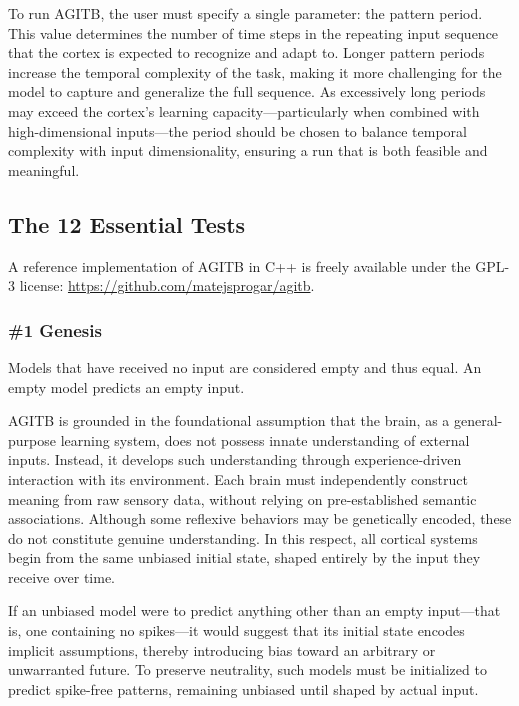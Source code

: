 \documentclass{article}
\newenvironment{two_assertions}[2]
{
  \begin{tabular}{p{1.5cm}p{8.2cm}}
    \textbf{Assertion:} & #1 \\
    \textbf{Assertion:} & #2 \\
}{
  \end{tabular}\\
}
\begin{document}
To run AGITB, the user must specify a single parameter: the pattern period. This value determines the number of time steps in the repeating input sequence that the cortex is expected to recognize and adapt to. Longer pattern periods increase the temporal complexity of the task, making it more challenging for the model to capture and generalize the full sequence. As excessively long periods may exceed the cortex’s learning capacity—particularly when combined with high-dimensional inputs—the period should be chosen to balance temporal complexity with input dimensionality, ensuring a run that is both feasible and meaningful.

\subsection{The 12 Essential Tests}

A reference implementation of AGITB in C++ is freely available under the GPL-3 license: \url{https://github.com/matejsprogar/agitb}.

\subsubsection*{\#1 Genesis}
\begin{two_assertions}
    {Models that have received no input are considered empty and thus equal.}
    {An empty model predicts an empty input.}
\end{two_assertions}

AGITB is grounded in the foundational assumption that the brain, as a general-purpose learning system, does not possess innate understanding of external inputs. Instead, it develops such understanding through experience-driven interaction with its environment. Each brain must independently construct meaning from raw sensory data, without relying on pre-established semantic associations. Although some reflexive behaviors may be genetically encoded, these do not constitute genuine understanding. In this respect, all cortical systems begin from the same unbiased initial state, shaped entirely by the input they receive over time.

If an unbiased model were to predict anything other than an empty input—that is, one containing no spikes—it would suggest that its initial state encodes implicit assumptions, thereby introducing bias toward an arbitrary or unwarranted future. To preserve neutrality, such models must be initialized to predict spike-free patterns, remaining unbiased until shaped by actual input.
\end{document}
